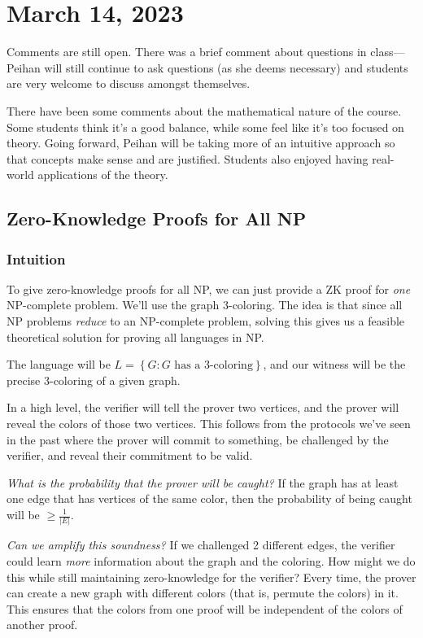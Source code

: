 \section{March 14, 2023}
\label{20230314}
Comments are still open. There was a brief comment about questions in class---Peihan will still continue to ask questions (as she deems necessary) and students are very welcome to discuss amongst themselves.

There have been some comments about the mathematical nature of the course. Some students think it's a good balance, while some feel like it's too focused on theory. Going forward, Peihan will be taking more of an intuitive approach so that concepts make sense and are justified. Students also enjoyed having real-world applications of the theory.

\subsection{Zero-Knowledge Proofs for All \textsf{NP}}
\subsubsection{Intuition}
To give zero-knowledge proofs for all \textsf{NP}, we can just provide a ZK proof for \emph{one} \textsf{NP}-complete problem. We'll use the graph 3-coloring. The idea is that since all \textsf{NP} problems \emph{reduce} to an \textsf{NP}-complete problem, solving this gives us a feasible theoretical solution for proving all languages in \textsf{NP}.


The language will be $L = \left\{ G : G\text{ has a 3-coloring} \right\}$, and our witness will be the precise 3-coloring of a given graph.

In a high level, the verifier will tell the prover two vertices, and the prover will reveal the colors of those two vertices. This follows from the protocols we've seen in the past where the prover will commit to something, be challenged by the verifier, and reveal their commitment to be valid.

\emph{What is the probability that the prover will be caught?} If the graph has at least one edge that has vertices of the same color, then the probability of being caught will be $\geq \frac{1}{|E|}$.

\emph{Can we amplify this soundness?} If we challenged 2 different edges, the verifier could learn \emph{more} information about the graph and the coloring. How might we do this while still maintaining zero-knowledge for the verifier? Every time, the prover can create a new graph with different colors (that is, permute the colors) in it. This ensures that the colors from one proof will be independent of the colors of another proof.


